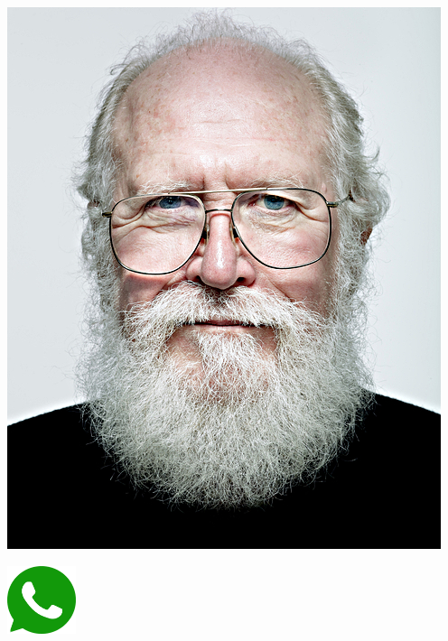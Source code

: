 {\begin{multicols}{3}
\begin{center}
	\includegraphics[height=.5\textheight]{./IMG-GIT/maddog.jpg}
\end{center}
\begin{flushright}
	\includegraphics[height=20mm]{./IMG-GIT/whatsapp.png}
\end{flushright}
\end{multicols}	

\vfill
\pagebreak

    
}
